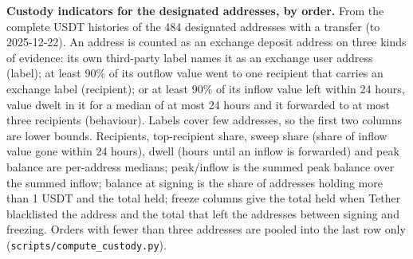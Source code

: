 \caption{\textbf{Custody indicators for the designated addresses, by order.} From the complete USDT histories of the 484 designated addresses with a transfer (to 2025-12-22). An address is counted as an exchange deposit address on three kinds of evidence: its own third-party label names it as an exchange user address (label); at least 90\% of its outflow value went to one recipient that carries an exchange label (recipient); or at least 90\% of its inflow value left within 24 hours, value dwelt in it for a median of at most 24 hours and it forwarded to at most three recipients (behaviour). Labels cover few addresses, so the first two columns are lower bounds. Recipients, top-recipient share, sweep share (share of inflow value gone within 24 hours), dwell (hours until an inflow is forwarded) and peak balance are per-address medians; peak/inflow is the summed peak balance over the summed inflow; balance at signing is the share of addresses holding more than 1 USDT and the total held; freeze columns give the total held when Tether blacklisted the address and the total that left the addresses between signing and freezing. Orders with fewer than three addresses are pooled into the last row only (\texttt{scripts/compute\_custody.py}).}
\label{tab:custody}
